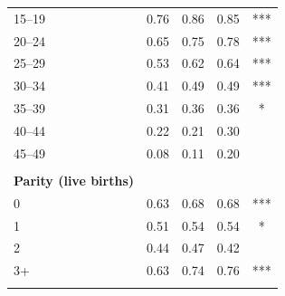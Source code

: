 \begin{tabular}{lcccc}
\hspace*{2em}15--19&0.76&0.86&0.85&***\\
\hspace*{2em}20--24&0.65&0.75&0.78&***\\
\hspace*{2em}25--29&0.53&0.62&0.64&***\\
\hspace*{2em}30--34&0.41&0.49&0.49&***\\
\hspace*{2em}35--39&0.31&0.36&0.36&*\\
\hspace*{2em}40--44&0.22&0.21&0.30&\\
\hspace*{2em}45--49&0.08&0.11&0.20&\\
&&&&\\
\textbf{Parity (live births)}&&&&\\
\hspace*{2em}0&0.63&0.68&0.68&***\\
\hspace*{2em}1&0.51&0.54&0.54&*\\
\hspace*{2em}2&0.44&0.47&0.42&\\
\hspace*{2em}3+&0.63&0.74&0.76&***\\
&&&&\\
\bottomrule
\end{tabular}
